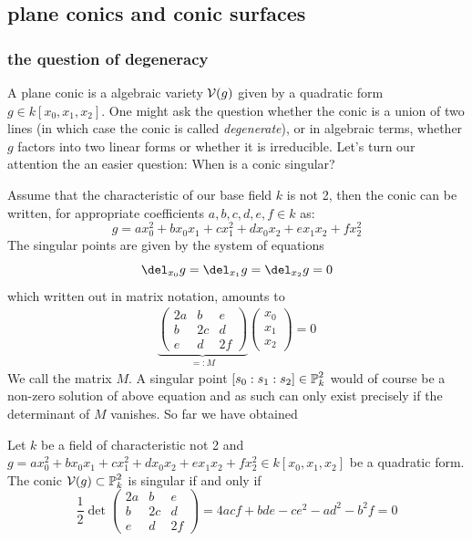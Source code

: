 \subsection{plane conics and conic surfaces}

\subsubsection{the question of degeneracy}

A plane conic is a algebraic variety $\operatorname{\mathcal V}(g)$ given by a quadratic form $g \in k[x_0,x_1,x_2]$. One might ask the question whether the conic is a union of two lines (in which case the conic is called \emph{degenerate}), or in algebraic terms, whether $g$ factors into two linear forms or whether it is irreducible.
Let's turn our attention the an easier question: When is a conic singular?

Assume that the characteristic of our base field $k$ is not 2, then the conic can be written, for appropriate coefficients $a,b,c,d,e,f \in k$ as:
\begin{equation}
g = ax_0^2 + bx_0x_1 + cx_1^2 + dx_0x_2 + ex_1x_2 + fx_2^2
\end{equation}
The singular points are given by the system of equations
\begin{equation}
\del_{x_0} g = \del_{x_1} g = \del_{x_2} g = 0
\end{equation}
which written out in matrix notation, amounts to
\begin{align}
\underset{=:M}{\underbrace{
\begin{pmatrix}
2a & b & e \\
b & 2c & d \\
e & d & 2f
\end{pmatrix}
}}
\begin{pmatrix}
x_0 \\ x_1 \\ x_2
\end{pmatrix}
= 0
\end{align}
We call the matrix $M$.
A singular point $[s_0:s_1:s_2] \in \operatorname{\mathbb P}^2_k$ would of course be a non-zero solution of above equation and as such can only exist precisely if the determinant of $M$ vanishes.
So far we have obtained

\begin{corollary}
Let $k$ be a field of characteristic not 2 and $g =  ax_0^2 + bx_0x_1 + cx_1^2 + dx_0x_2 + ex_1x_2 + fx_2^2
\in k[x_0,x_1,x_2]$ be a quadratic form. The conic $\operatorname{\mathcal V}(g) \subset \operatorname{\mathbb P}^2_k$ is singular if and only if
\begin{equation}
\frac 12
\det
\begin{pmatrix}
2a & b & e \\
b & 2c & d \\
e & d & 2f
\end{pmatrix}
= 4acf + bde - ce^2 - ad^2 - b^2f = 0
\end{equation}
\end{corollary}

